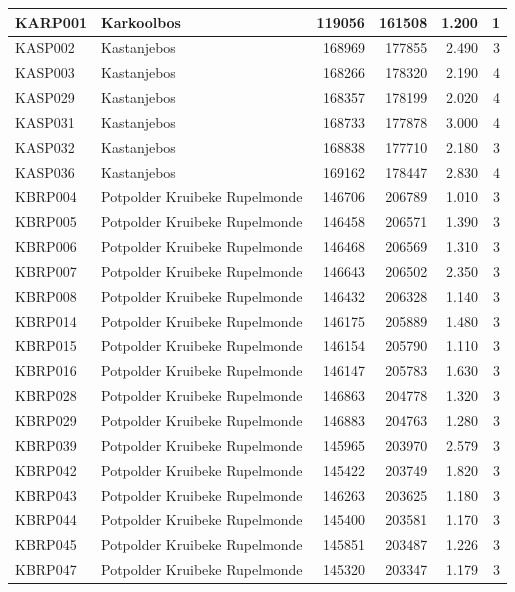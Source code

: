 \documentclass[11pt,]{book}
\begin{document}
\begin{table}
\begin{tabular}[t]{l|l|r|r|r|r}
\hline
KARP001 & Karkoolbos & 119056 & 161508 & 1.200 & 1\\
\hline
KASP002 & Kastanjebos & 168969 & 177855 & 2.490 & 3\\
\hline
KASP003 & Kastanjebos & 168266 & 178320 & 2.190 & 4\\
\hline
KASP029 & Kastanjebos & 168357 & 178199 & 2.020 & 4\\
\hline
KASP031 & Kastanjebos & 168733 & 177878 & 3.000 & 4\\
\hline
KASP032 & Kastanjebos & 168838 & 177710 & 2.180 & 3\\
\hline
KASP036 & Kastanjebos & 169162 & 178447 & 2.830 & 4\\
\hline
KBRP004 & Potpolder Kruibeke Rupelmonde & 146706 & 206789 & 1.010 & 3\\
\hline
KBRP005 & Potpolder Kruibeke Rupelmonde & 146458 & 206571 & 1.390 & 3\\
\hline
KBRP006 & Potpolder Kruibeke Rupelmonde & 146468 & 206569 & 1.310 & 3\\
\hline
KBRP007 & Potpolder Kruibeke Rupelmonde & 146643 & 206502 & 2.350 & 3\\
\hline
KBRP008 & Potpolder Kruibeke Rupelmonde & 146432 & 206328 & 1.140 & 3\\
\hline
KBRP014 & Potpolder Kruibeke Rupelmonde & 146175 & 205889 & 1.480 & 3\\
\hline
KBRP015 & Potpolder Kruibeke Rupelmonde & 146154 & 205790 & 1.110 & 3\\
\hline
KBRP016 & Potpolder Kruibeke Rupelmonde & 146147 & 205783 & 1.630 & 3\\
\hline
KBRP028 & Potpolder Kruibeke Rupelmonde & 146863 & 204778 & 1.320 & 3\\
\hline
KBRP029 & Potpolder Kruibeke Rupelmonde & 146883 & 204763 & 1.280 & 3\\
\hline
KBRP039 & Potpolder Kruibeke Rupelmonde & 145965 & 203970 & 2.579 & 3\\
\hline
KBRP042 & Potpolder Kruibeke Rupelmonde & 145422 & 203749 & 1.820 & 3\\
\hline
KBRP043 & Potpolder Kruibeke Rupelmonde & 146263 & 203625 & 1.180 & 3\\
\hline
KBRP044 & Potpolder Kruibeke Rupelmonde & 145400 & 203581 & 1.170 & 3\\
\hline
KBRP045 & Potpolder Kruibeke Rupelmonde & 145851 & 203487 & 1.226 & 3\\
\hline
KBRP047 & Potpolder Kruibeke Rupelmonde & 145320 & 203347 & 1.179 & 3\\

\end{tabular}
\end{table}
\end{document}

